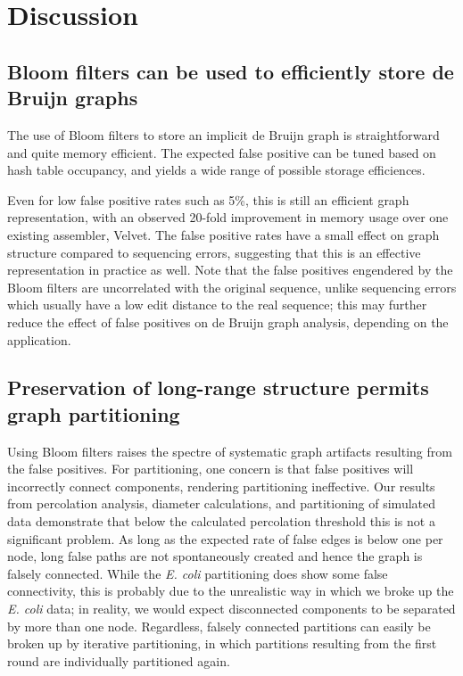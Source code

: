 \documentclass[12pt]{article} \usepackage{simplemargins}
\begin{document}
\section{Discussion}

\subsection{Bloom filters can be used to efficiently store de Bruijn graphs}


The use of Bloom filters to store an implicit de Bruijn graph is
straightforward and quite memory efficient.  The expected false
positive can be tuned based on hash table occupancy, and yields a wide
range of possible storage efficiences.


Even for low false positive rates such as 5\%, this is still an 
efficient graph representation, with an observed 20-fold improvement
in memory usage over one existing assembler, Velvet.  The false
positive rates have a small effect on graph structure compared to
sequencing errors, suggesting that this is an effective representation
in practice as well.  Note that the false positives engendered by the
Bloom filters are uncorrelated with the original sequence, unlike
sequencing errors which usually have a low edit distance to the
real sequence; this may further reduce the effect of false positives
on de Bruijn graph analysis, depending on the application.

\subsection{Preservation of long-range structure permits graph partitioning}

Using Bloom filters raises the spectre of systematic graph artifacts
resulting from the false positives.  For partitioning, one concern is
that false positives will incorrectly connect components, rendering
partitioning ineffective.  Our results from percolation analysis,
diameter calculations, and partitioning of simulated data demonstrate
that below the calculated percolation threshold this is not a
significant problem.  As long as the expected rate of false edges is
below one per node, long false paths are not spontaneously created and
hence the graph is falsely connected.  While the \emph{E. coli} partitioning
does show some false connectivity, this is probably due to the
unrealistic way in which we broke up the \emph{E. coli} data; in reality, we
would expect disconnected components to be separated by more than one
node.  Regardless, falsely connected partitions can easily be broken
up by iterative partitioning, in which partitions resulting from the
first round are individually partitioned again.
\end{document}
